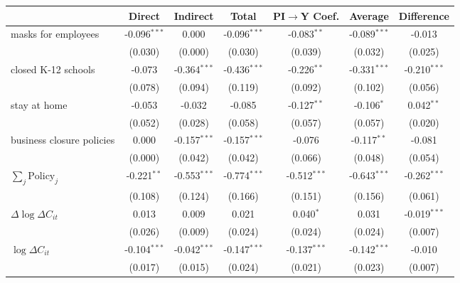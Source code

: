 
\begin{tabular}{lccccc|>{}c}
\toprule
  & Direct & Indirect & Total & PI$\to$Y Coef. & Average & Difference\\
\midrule
masks for employees & -0.096$^{***}$ & 0.000 & -0.096$^{***}$ & -0.083$^{**}$ & -0.089$^{***}$ & -0.013\\
 & (0.030) & (0.000) & (0.030) & (0.039) & (0.032) & (0.025)\\
closed K-12 schools & -0.073 & -0.364$^{***}$ & -0.436$^{***}$ & -0.226$^{**}$ & -0.331$^{***}$ & -0.210$^{***}$\\
 & (0.078) & (0.094) & (0.119) & (0.092) & (0.102) & (0.056)\\
stay at home & -0.053 & -0.032 & -0.085 & -0.127$^{**}$ & -0.106$^{*}$ & 0.042$^{**}$\\
 & (0.052) & (0.028) & (0.058) & (0.057) & (0.057) & (0.020)\\
business closure policies & 0.000 & -0.157$^{***}$ & -0.157$^{***}$ & -0.076 & -0.117$^{**}$ & -0.081\\
 & (0.000) & (0.042) & (0.042) & (0.066) & (0.048) & (0.054)\\
$\sum_j \mathrm{Policy}_j$ & -0.221$^{**}$ & -0.553$^{***}$ & -0.774$^{***}$ & -0.512$^{***}$ & -0.643$^{***}$ & -0.262$^{***}$\\
 & (0.108) & (0.124) & (0.166) & (0.151) & (0.156) & (0.061)\\
$\Delta \log \Delta C_{it}$ & 0.013 & 0.009 & 0.021 & 0.040$^{*}$ & 0.031 & -0.019$^{***}$\\
 & (0.026) & (0.009) & (0.024) & (0.024) & (0.024) & (0.007)\\
$\log \Delta C_{it}$ & -0.104$^{***}$ & -0.042$^{***}$ & -0.147$^{***}$ & -0.137$^{***}$ & -0.142$^{***}$ & -0.010\\
 & (0.017) & (0.015) & (0.024) & (0.021) & (0.023) & (0.007)\\
\bottomrule
\end{tabular}